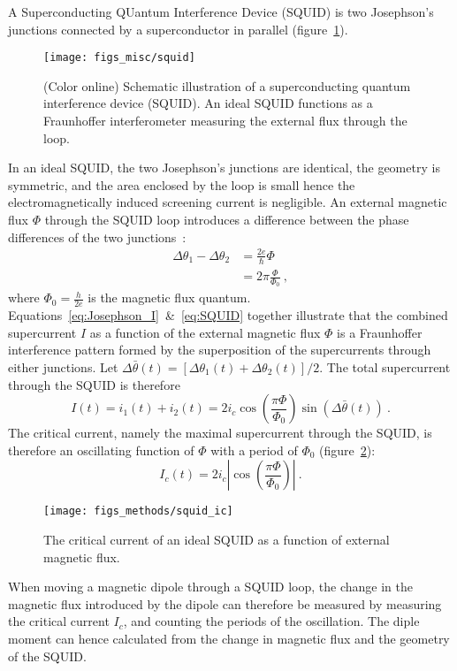 A Superconducting QUantum Interference Device (SQUID) is two Josephson's junctions connected by a superconductor in parallel (figure~\ref{fig:squid}). %
\begin{figure}[ht]%
	\centering%
    \texttt{[image: figs\_misc/squid]}%
    \caption[Superconducting quantum interference device]{\label{fig:squid}(Color online) Schematic illustration of a superconducting quantum interference device (SQUID). An ideal SQUID functions as a Fraunhoffer interferometer measuring the external flux through the loop.}%
\end{figure}%
%
In an ideal SQUID, the two Josephson's junctions are identical, the geometry is symmetric, and the area enclosed by the loop is small hence the electromagnetically induced screening current is negligible. An external magnetic flux $\Phi$ through the SQUID loop introduces a difference between the phase differences of the two junctions~\cite{Annett}:%
\begin{align}
    \Delta\theta_1 - \Delta\theta_2 &= \frac{2e}{\hbar}\Phi\nonumber\\
        &= 2\pi\frac{\Phi}{\Phi_0}~,\label{eq:SQUID}
\end{align}%
where $\Phi_0 = \frac{h}{2e}$ is the magnetic flux quantum. Equations~\ref{eq:Josephson_I}~\&~\ref{eq:SQUID} together illustrate that the combined supercurrent $I$ as a function of the external magnetic flux $\Phi$ is a Fraunhoffer interference pattern formed by the superposition of the supercurrents through either junctions. Let $\Delta\bar{\theta}(t) = \left[\Delta\theta_1(t) + \Delta\theta_2(t)\right] / 2$. The total supercurrent through the SQUID is therefore%
\begin{equation}
    I(t) = i_1(t) + i_2(t) = 2i_c\cos\left(\frac{\pi\Phi}{\Phi_0}\right)\sin\left(\Delta\bar{\theta}(t)\right)~.
\end{equation}%
The critical current, namely the maximal supercurrent through the SQUID, is therefore an oscillating function of $\Phi$ with a period of $\Phi_0$ (figure~\ref{fig:squid_ic}):%
\begin{equation}
    I_{c}(t) = 2i_c\left|\cos\left(\frac{\pi\Phi}{\Phi_0}\right)\right|~.
\end{equation}%
\begin{figure}[ht]%
	\centering%
    \texttt{[image: figs\_methods/squid\_ic]}%
    \caption[Oscillations in the critical current of a SQUID]{\label{fig:squid_ic}The critical current of an ideal SQUID as a function of external magnetic flux.}%
\end{figure}%
%
When moving a magnetic dipole through a SQUID loop, the change in the magnetic flux introduced by the dipole can therefore be measured by measuring the critical current $I_c$, and counting the periods of the oscillation. The diple moment can hence calculated from the change in magnetic flux and the geometry of the SQUID.

